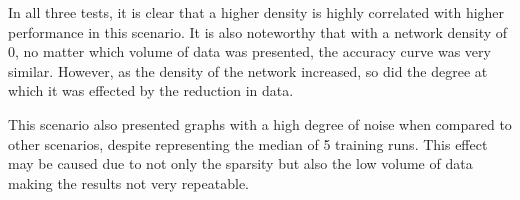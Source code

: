 In all three tests, it is clear that a higher density is highly correlated with higher performance in this scenario. It is also noteworthy that with a network density of 0, no matter which volume of data was presented, the accuracy curve was very similar. However, as the density of the network increased, so did the degree at which it was effected by the reduction in data.

This scenario also presented graphs with a high degree of noise when compared to other scenarios, despite representing the median of 5 training runs. This effect may be caused due to not only the sparsity but also the low volume of data making the results not very repeatable.

